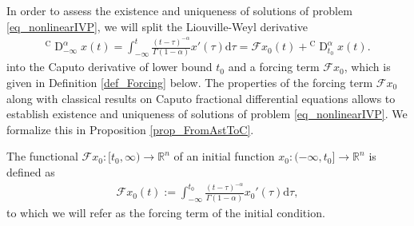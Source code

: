 \documentclass{svproc}
\newcommand{\realnumbers}{\mathbb{R}}
\newcommand{\dsomething}[1]{\mathrm{d}#1}
\newcommand{\CderivativeInput}[2]{{}^\mathrm{C}\operatorname{D}_{#2}^{#1}}
\begin{document}
    In order to {assess} the existence and uniqueness of solutions of problem \eqref{eq_nonlinearIVP}, we will split the Liouville-Weyl derivative 
    \begin{align} \label{eq_SplitDerivative1}
	\CderivativeInput{\alpha}{-\infty}x(t)= \int_{-\infty}^t\frac{(t-\tau)^{-\alpha}}{\Gamma(1-\alpha)}x'(\tau)\dsomething{\tau} = \mathcal{F}x_0(t) + \CderivativeInput{\alpha}{t_0}x(t).
\end{align}
into the Caputo derivative of lower bound $t_0$ and a forcing term $\mathcal F x_0$, which is given in Definition \ref{def_Forcing} below. The properties of the forcing term $\mathcal F x_0$ along with classical results on Caputo fractional differential equations allows to establish existence and uniqueness of solutions of problem \eqref{eq_nonlinearIVP}. We formalize this in Proposition \ref{prop_FromAstToC}.
	\begin{definition}\label{def_Forcing}
		 The functional $\mathcal{F}x_0:[t_0,\infty) \to \realnumbers^n$ of an initial function $x_0:(-\infty,t_0]\to \realnumbers^n$ is defined as
		\begin{align}\label{eq_ForcingIVP}
			\mathcal{F}x_0(t) := \int_{-\infty}^{t_0}\frac{(t-\tau)^{-\alpha}}{\Gamma(1-\alpha)}x_0'(\tau)\dsomething{\tau},
		\end{align} to which we will refer as the forcing term of the initial condition.
	\end{definition}
	
\end{document}
